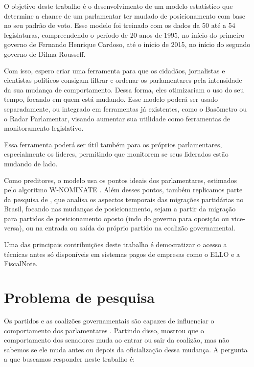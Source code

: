 O objetivo deste trabalho é o desenvolvimento de um modelo estatístico que
determine a chance de um parlamentar ter mudado de posicionamento com base no
seu padrão de voto. Esse modelo foi treinado com os dados da
50\textordfeminine{} até a 54\textordfeminine{} legislaturas, compreendendo o
período de 20 anos de 1995, no início do primeiro governo de Fernando Henrique
Cardoso, até o início de 2015, no início do segundo governo de Dilma Rousseff.

Com isso, espero criar uma ferramenta para que os cidadãos, jornalistas e
cientistas políticos consigam filtrar e ordenar os parlamentares pela
intensidade da sua mudança de comportamento. Dessa forma, eles otimizariam o
uso do seu tempo, focando em quem está mudando. Esse modelo poderá ser usado
separadamente, ou integrado em ferramentas já existentes, como o Basômetro ou o
Radar Parlamentar, visando aumentar sua utilidade como ferramentas de
monitoramento legislativo.

Essa ferramenta poderá ser útil também para os próprios parlamentares,
especialmente os líderes, permitindo que monitorem se seus liderados estão
mudando de lado.

Como preditores, o modelo usa os pontos ideais dos parlamentares, estimados
pelo algoritmo W-NOMINATE \cite{Poole1985,Poole2005}. Além desses pontos,
também replicamos parte da pesquisa de , que analisa os
aspectos temporais das migrações partidárias no Brasil, focando nas mudanças de
posicionamento, sejam a partir da migração para partidos de posicionamento
oposto (indo do governo para oposição ou vice-versa), ou na entrada ou saída do
próprio partido na coalizão governamental.

Uma das principais contribuições deste trabalho é democratizar o acesso a
técnicas antes só disponíveis em sistemas pagos de empresas como o \gls{ELLO}
e a FiscalNote.

\section{Problema de pesquisa}
\label{cap:introducao:problemas-de-pesquisa}

Os partidos e as coalizões governamentais são capazes de influenciar o
comportamento dos parlamentares \cite{Figueiredo2001,Santos2003}. Partindo
disso,  mostrou que o comportamento dos senadores muda ao
entrar ou sair da coalizão, mas não sabemos se ele muda antes ou depois da
oficialização dessa mudança. A pergunta a que buscamos responder neste trabalho
é:

